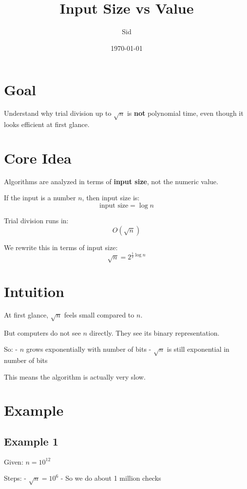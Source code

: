 \documentclass{article}
\title{Input Size vs Value}
\author{Sid}
\date{\today}
\begin{document}
\maketitle


\section{Goal}

Understand why trial division up to $\sqrt{n}$ is \textbf{not} polynomial time, even though it looks efficient at first glance.

\section{Core Idea}

Algorithms are analyzed in terms of \textbf{input size}, not the numeric value.

If the input is a number $n$, then input size is:
\[
    \text{input size} = \log n
\]

Trial division runs in:
\[
    O(\sqrt{n})
\]

We rewrite this in terms of input size:
\[
    \sqrt{n} = 2^{\frac{1}{2} \log n}
\]

\section{Intuition}

At first glance, $\sqrt{n}$ feels small compared to $n$.

But computers do not see $n$ directly. They see its binary representation.

So:
- $n$ grows exponentially with number of bits
- $\sqrt{n}$ is still exponential in number of bits

This means the algorithm is actually very slow.

\section{Example}

\subsection*{Example 1}

Given: $n = 10^{12}$

Steps:
- $\sqrt{n} = 10^6$
- So we do about 1 million checks
\end{document}
